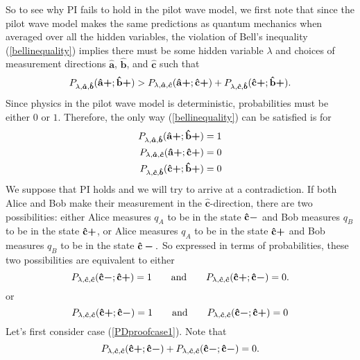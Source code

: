 So to see why PI fails to hold in the pilot wave model, we first note that since the pilot wave model makes the same predictions as quantum mechanics when averaged over all the hidden variables, the violation of Bell's inequality (\ref{bellinequality}) implies there must be some hidden variable $\lambda$ and choices of measurement directions $\bm{\hat{a}}$, $\bm{\hat{b}}$, and $\bm{\hat{c}}$ such that 
 \begin{equation}\label{bellinequality}
P_{\lambda,\bm{\hat{a}},\bm{\hat{b}}}(\vb{\hat{{a}}}\bm{+};\vb{\hat{{b}}}\bm{+})> P_{\lambda,\bm{\hat{a}},\bm{\hat{c}}}(\vb{\hat{{a}}}\bm{+};\vb{\hat{{c}}}\bm{+})+P_{\lambda,\bm{\hat{c}},\bm{\hat{b}}}(\vb{\hat{{c}}}\bm{+};\vb{\hat{{b}}}\bm{+}).
\end{equation}
Since physics in the pilot wave model is deterministic, probabilities must be either $0$ or $1$. Therefore, the only way (\ref{bellinequality}) can be satisfied is for
 \begin{align}
P_{\lambda,\bm{\hat{a}},\bm{\hat{b}}}(\vb{\hat{{a}}}\bm{+};\vb{\hat{{b}}}\bm{+})&=1 \label{PDproof1}\\
P_{\lambda,\bm{\hat{a}},\bm{\hat{c}}}(\vb{\hat{{a}}}\bm{+};\vb{\hat{{c}}}\bm{+})&=0 \label{PDproof2}\\
P_{\lambda,\bm{\hat{c}},\bm{\hat{b}}}(\vb{\hat{{c}}}\bm{+};\vb{\hat{{b}}}\bm{+})&=0 \label{PDproof3}
 \end{align}
 We suppose that PI holds and we will try to arrive at a contradiction. If both Alice and Bob make their measurement in the $\bm{\hat{c}}$-direction, there are two possibilities: either Alice measures $q_A$ to be in the state $\vb{\hat{{c}}}\bm{-}$ and Bob measures $q_B$ to be in the state $\vb{\hat{{c}}}\bm{+}$, or Alice measures $q_A$ to be in the state $\vb{\hat{{c}}}\bm{+}$ and Bob measures $q_B$ to be in the state $\vb{\hat{{c}}}\bm{-}.$ So expressed in terms of probabilities, these two possibilities are equivalent to either 
 \begin{equation}\label{PDproofcase1}
 P_{\lambda,\bm{\hat{c}},\bm{\hat{c}}}(\vb{\hat{{c}}}\bm{-};\vb{\hat{{c}}}\bm{+})=1 \qquad\text{and}\qquad  P_{\lambda,\bm{\hat{c}},\bm{\hat{c}}}(\vb{\hat{{c}}}\bm{+};\vb{\hat{{c}}}\bm{-})=0.
 \end{equation}
 or 
  \begin{equation}\label{PDproofcase2}
 P_{\lambda,\bm{\hat{c}},\bm{\hat{c}}}(\vb{\hat{{c}}}\bm{+};\vb{\hat{{c}}}\bm{-})=1 \qquad\text{and}\qquad P_{\lambda,\bm{\hat{c}},\bm{\hat{c}}}(\vb{\hat{{c}}}\bm{-};\vb{\hat{{c}}}\bm{+})=0
 \end{equation}
 Let's first consider case (\ref{PDproofcase1}). Note that
\begin{equation}
 P_{\lambda,\bm{\hat{c}},\bm{\hat{c}}}(\vb{\hat{{c}}}\bm{+};\vb{\hat{{c}}}\bm{-})+P_{\lambda,\bm{\hat{c}},\bm{\hat{c}}}(\vb{\hat{{c}}}\bm{-};\vb{\hat{{c}}}\bm{-})=0.
\end{equation}
